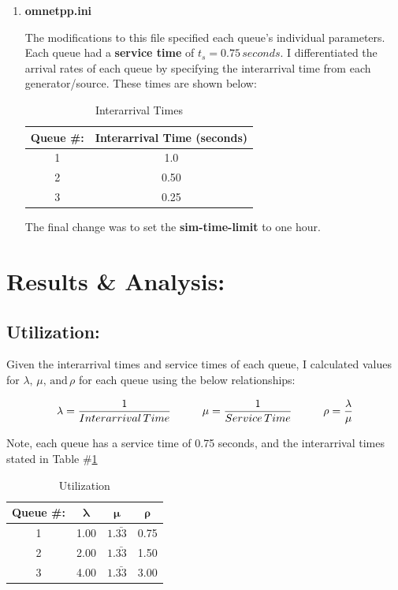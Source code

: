 \documentclass{article}
\begin{document}
\begin{enumerate}
	\item \textbf{omnetpp.ini}
	
The modifications to this file specified each queue's individual parameters.  Each queue had a \textbf{service time} of $t_s = 0.75 \, seconds$.
I differentiated the arrival rates of each queue by specifying the interarrival time from each generator/source.
These times are shown below:

\begin{table}[h!]
\centering
\begin{tabular}{|c|c|} \hline
\textbf{Queue \#:} & \textbf{ Interarrival Time (seconds)} \\ \hline
1 & 1.0 \\ \hline
2 & 0.50 \\ \hline
3 & 0.25 \\ \hline
\end{tabular}
\caption{Interarrival Times}
\label{InterarrivalTimes}
\end{table}

The final change was to set the \textbf{sim-time-limit} to one hour.
\end{enumerate}

\newpage
\section*{Results \& Analysis:}
\subsection*{Utilization:}
Given the interarrival times and service times of each queue, I calculated values for $\lambda, \, \mu, \, \mathrm{and} \, \rho$ for each queue using the below relationships:

\begin{align*}
\lambda = \frac{1}{Interarrival \, Time} \hspace{1 cm} \mu = \frac{1}{Service \, Time} \hspace{1cm} \rho = \frac{\lambda}{\mu}
\end{align*}

Note, each queue has a service time of 0.75 seconds, and the interarrival times stated in Table \#\ref{InterarrivalTimes}

\begin{table}[h!]
\centering
\begin{tabular}{|c|c|c|c|} \hline
\textbf{Queue \#:} & $\mathbf{\lambda}$ & $\mathbf{\mu}$ & $\mathbf{\rho}$ \\ \hline
1 & 1.00 & $1.\bar{33}$ & 0.75  \\ \hline
2 & 2.00 & $1.\bar{33}$ & 1.50 \\ \hline
3 & 4.00 & $1.\bar{33}$ & 3.00\\ \hline
\end{tabular}
\caption{Utilization}
\label{Utilization}
\end{table}
\end{document}
